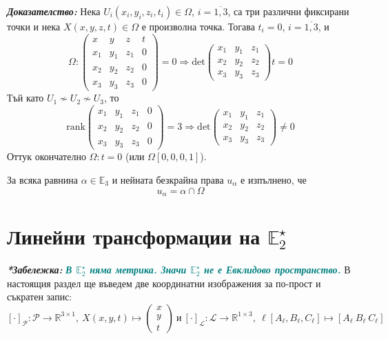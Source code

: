 \documentclass[12pt]{article}
\begin{document}
\textit{\textbf{Доказателство:}} Нека $U_i(x_i,y_i,z_i,t_i)\in\Omega$, $i=\overline{1,3}$, са три различни фиксирани точки и нека $X(x,y,z,t)\in\Omega$ е произволна точка. Тогава $t_i=0$, $i=\overline{1,3}$, и $$\Omega:\begin{pmatrix}x & y & z & t \\ x_1 & y_1 &z_1 & 0 \\ x_2 & y_2 &z_2 & 0 \\ x_3 & y_3 &z_3 &0 \end{pmatrix}=0\Rightarrow \mathrm{det}\begin{pmatrix}x_1 & y_1 &z_1 \\ x_2 & y_2 & z_2 \\ x_3 & y_3 & z_3\end{pmatrix}t=0$$ Тъй като $U_1\not\sim U_2\not\sim U_3$, то $$\mathrm{rank}\begin{pmatrix}x_1 & y_1 & z_1 & 0 \\ x_2 & y_2 & z_2 & 0 \\ x_3 & y_3 & z_3 & 0\end{pmatrix}=3\Rightarrow\mathrm{det}\begin{pmatrix}x_1 & y_1 &z_1 \\ x_2 & y_2 & z_2 \\ x_3 & y_3 & z_3\end{pmatrix}\neq 0$$ Оттук окончателно $\Omega:t=0$ (или $\Omega[0,0,0,1]$).
\\
\begin{tcolorbox}[
    colback=blue!5,    %
    colframe=blue!75!black, %
    title={\textbf{Твърдение 7:}}, %
    fonttitle=\bfseries,
    boxrule=0.8pt,
    arc=1mm,           %
    top=2mm, bottom=2mm, left=3mm, right=3mm
]  За всяка равнина $\alpha\in\mathbb{E}_3$ и нейната безкрайна права $u_{\alpha}$ е изпълнено, че $$u_\alpha=\alpha\cap\Omega$$
\end{tcolorbox}
\Large{\section{ Линейни трансформации на $\mathbb{E}_2^\star$}}
\textbf{\textit{*Забележка:}} \textbf{\textit{\textcolor{teal}{В $\mathbb E_2^\star$ няма метрика. Значи $\mathbb{E}_2^\star$ не е Евклидово пространство.}}}
В настоящия раздел ще въведем две координатни изображения за по-прост и съкратен запис: $$[\cdot]_{\mathcal P}:\mathcal P\to\mathbb{R}^{3\times 1},\ X(x,y,t)\mapsto\begin{pmatrix}x \\y \\ t\end{pmatrix}\ \text{и}\ [\cdot]_{\mathcal L}:\mathcal L\to\mathbb{R}^{1\times 3},\ \ell[A_\ell,B_\ell,C_\ell]\mapsto [A_\ell\ B_\ell\ C_\ell]$$
\end{document}
